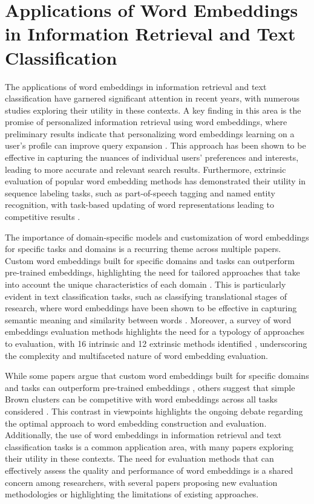 \documentclass[conference]{IEEEtran}
\begin{document}
\section{Applications of Word Embeddings in Information Retrieval and Text Classification}
The applications of word embeddings in information retrieval and text classification have garnered significant attention in recent years, with numerous studies exploring their utility in these contexts. A key finding in this area is the promise of personalized information retrieval using word embeddings, where preliminary results indicate that personalizing word embeddings learning on a user's profile can improve query expansion \cite{towardWordEmbedding}. This approach has been shown to be effective in capturing the nuances of individual users' preferences and interests, leading to more accurate and relevant search results. Furthermore, extrinsic evaluation of popular word embedding methods has demonstrated their utility in sequence labeling tasks, such as part-of-speech tagging and named entity recognition, with task-based updating of word representations leading to competitive results \cite{bigDataSmallData}.

The importance of domain-specific models and customization of word embeddings for specific tasks and domains is a recurring theme across multiple papers. Custom word embeddings built for specific domains and tasks can outperform pre-trained embeddings, highlighting the need for tailored approaches that take into account the unique characteristics of each domain \cite{utilityGeneralSpecific}. This is particularly evident in text classification tasks, such as classifying translational stages of research, where word embeddings have been shown to be effective in capturing semantic meaning and similarity between words \cite{utilityGeneralSpecific}. Moreover, a survey of word embeddings evaluation methods highlights the need for a typology of approaches to evaluation, with 16 intrinsic and 12 extrinsic methods identified \cite{surveyWordEmbeddings}, underscoring the complexity and multifaceted nature of word embedding evaluation.

While some papers argue that custom word embeddings built for specific domains and tasks can outperform pre-trained embeddings \cite{utilityGeneralSpecific}, others suggest that simple Brown clusters can be competitive with word embeddings across all tasks considered \cite{bigDataSmallData}. This contrast in viewpoints highlights the ongoing debate regarding the optimal approach to word embedding construction and evaluation. Additionally, the use of word embeddings in information retrieval and text classification tasks is a common application area, with many papers exploring their utility in these contexts. The need for evaluation methods that can effectively assess the quality and performance of word embeddings is a shared concern among researchers, with several papers proposing new evaluation methodologies or highlighting the limitations of existing approaches.
\end{document}
